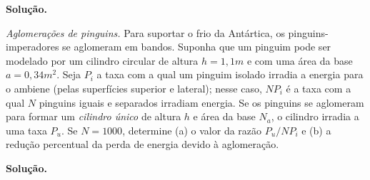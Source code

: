 \documentclass[a4paper, 12pt]{article}
\newenvironment{question}[2][Questão]{\begin{trivlist}
\item[\hskip \labelsep {\bfseries #1}\hskip \labelsep {\bfseries #2.}]}{\end{trivlist}}
\begin{document}
\noindent\textbf{Solução.}

\begin{question}{3} 
\emph{Aglomerações de pinguins.} Para suportar o frio da Antártica, os pinguins-imperadores se aglomeram em bandos. Suponha que um pinguim pode ser modelado por um cilindro circular de altura $h=1,1m$ e com uma área da base $a=0,34m^2$. Seja $P_i$ a taxa com a qual um pinguim isolado irradia a energia para o ambiene (pelas superfícies superior e lateral); nesse caso, $NP_{i}$ é a taxa com a qual $N$ pinguins iguais e separados irradiam energia. Se os pinguins se aglomeram para formar um \emph{cilindro único} de altura $h$ e área da base $N_a$, o cilindro irradia a uma taxa $P_{u}$. Se $N=1000$, determine (a) o valor da razão $P_{u}/NP_{i}$ e (b) a redução percentual da perda de energia devido à aglomeração.

\end{question}
 
\noindent\textbf{Solução.}
\end{document}
